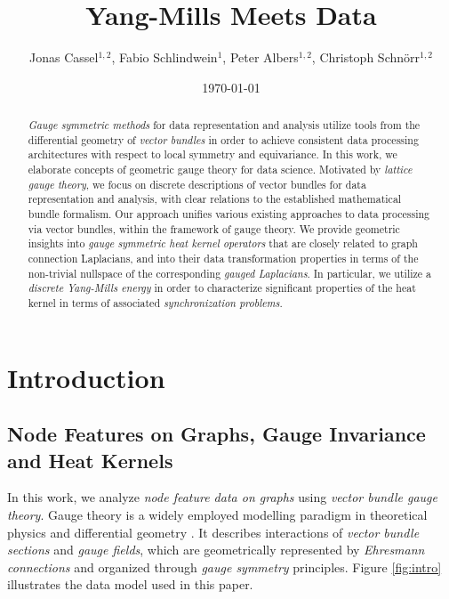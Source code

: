 \documentclass[10pt,reqno]{amsart}
\author[]{\small Jonas Cassel$^{1,2}$, Fabio Schlindwein$^{1}$, Peter Albers$^{1,2}$, Christoph Schn\"{o}rr$^{1,2}$}
\date{\today}
\title{Yang-Mills Meets Data}
\numberwithin{equation}{section}
\theoremstyle{bfnote}
\theoremstyle{bfdef}
\begin{document}
\maketitle

\begin{abstract}
\textit{Gauge symmetric methods} for data representation and analysis utilize tools from the differential geometry of \textit{vector bundles} in order to achieve consistent data processing architectures with respect to local symmetry and equivariance.
In this work, we elaborate concepts of geometric gauge theory for data science. Motivated by \textit{lattice gauge theory}, we focus on discrete descriptions of vector bundles for data representation and analysis, with clear relations to the established mathematical bundle formalism. Our approach unifies various existing approaches to data processing via vector bundles, within the framework of gauge theory.
We provide geometric insights into \textit{gauge symmetric heat kernel operators} that are closely related to graph connection Laplacians, and into their data transformation properties in terms of the non-trivial nullspace of the corresponding \textit{gauged Laplacians}. In particular, we utilize a \textit{discrete Yang-Mills energy} in order to characterize significant properties of the heat kernel in terms of associated \textit{synchronization problems}.
\end{abstract}

\tableofcontents

\section{Introduction}
\subsection{Node Features on Graphs, Gauge Invariance and Heat Kernels}\label{sec:intro1}

		In this work, we analyze \textit{node feature data on graphs} using \textit{vector bundle gauge theory}. Gauge theory is a widely employed modelling paradigm in theoretical physics \cite{peskinIntroductionQuantumField1995a,hamiltonMathematicalGaugeTheory2017} and differential geometry \cite{Berline:1996aa,Jost:2017aa}.
		It describes interactions of \textit{vector bundle sections} and \textit{gauge fields}, which are geometrically represented by \textit{Ehresmann connections} and organized through \textit{gauge symmetry} principles. Figure \ref{fig:intro} illustrates the data model used in this paper.
\end{document}
